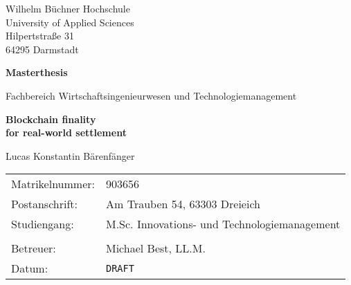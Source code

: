 \begin{titlepage}

	\large
	Wilhelm Büchner Hochschule \\
	University of Applied Sciences \\
	Hilpertstraße 31 \\
	64295 Darmstadt

	\vfill

	\begin{center}
		\Large
			\textbf{Masterthesis}

			\vspace{0.5cm}

			Fachbereich Wirtschaftsingenieurwesen und Technologiemanagement

			\vfill

		\Huge
			\textbf{
				Blockchain finality \\
				for real-world settlement
			}

			\vfill

		\Large
			Lucas Konstantin Bärenfänger
	\end{center}

	\vfill
	
	\begin{tabularx}{\textwidth}{@{}l X}
		Matrikelnummer: & 903656 \\
		Postanschrift:  & Am Trauben 54, 63303 Dreieich \\
		Studiengang:    & M.Sc. Innovations- und Technologiemanagement \\
		\\
		Betreuer:       & Michael Best, LL.M. \\
		Datum:          & \texttt{DRAFT}
	\end{tabularx}

\end{titlepage}
